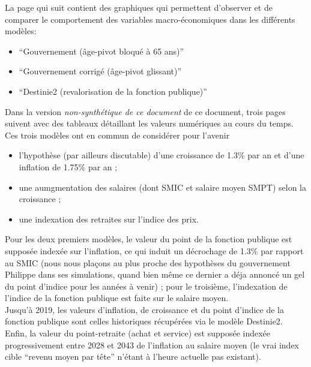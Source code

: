 La page qui suit contient des graphiques qui permettent d'observer et de comparer le comportement des variables macro-économiques dans les différents modèles:
\begin{itemize}
\item ``Gouvernement (âge-pivot bloqué à 65 ans)''
\item ``Gouvernement corrigé (âge-pivot glissant)''
\item ``Destinie2 (revalorisation de la fonction publique)''
\end{itemize}
Dans la version \emph{non-synthétique de ce document} de ce document, trois pages suivent avec des tableaux détaillant les valeurs numériques au cours du temps.\\
Ces trois modèles ont en commun de considérer pour l'avenir
\begin{itemize}
\item l'hypothèse (par ailleurs discutable) d'une croissance de 1.3\% par an et d'une inflation de 1.75\% par an ;
\item une aumgmentation des salaires (dont SMIC et salaire moyen SMPT) selon la croissance ;
\item une indexation des retraites sur l'indice des prix.
\end{itemize}
Pour les deux premiers modèles, le valeur du point de la fonction publique est supposée indexée sur l'inflation, ce qui induit un décrochage de 1.3\% par rapport au SMIC (nous nous plaçons au plus proche des hypothèses du gouvernement Philippe dans ses simulations, quand bien même ce dernier a déja annoncé un gel du point d'indice pour les années à venir) ; pour le troisième, l'indexation de l'indice de la fonction publique est faite sur le salaire moyen. \\
Jusqu'à 2019, les valeurs d'inflation, de croissance et du point d'indice de la fonction publique sont celles historiques récupérées via le modèle Destinie2. \\
Enfin, la valeur du point-retraite (achat et service) est supposée indexée progressivement entre 2028 et 2043 de l'inflation au salaire moyen (le vrai index cible ``revenu moyen par tête'' n'étant à l'heure actuelle pas existant).

~\\

